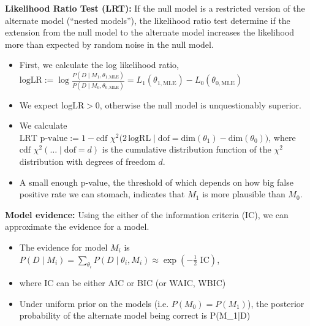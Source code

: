 {\bf Likelihood Ratio Test (LRT):} If the null model is a restricted version of the alternate model (``nested models''), the likelihood ratio test determine if the extension from the null model to the alternate model increases the likelihood more than expected by random noise in the null model.
\begin{itemize}
	\item First, we calculate the log likelihood ratio, $\text{logLR} := \log\frac{P(D\;|\;M_1, \theta_{1,\text{MLE}})}{P(D\;|\;M_0, \theta_{0,\text{MLE}})} = L_1(\theta_{1,\text{MLE}}) - L_0(\theta_{0,\text{MLE}})$
	\item We expect $\text{logLR} > 0$, otherwise the null model is unquestionably superior.
	\item We calculate $\text{LRT p-value} := 1 - \text{cdf }\chi^2\Big(2\,\text{logRL}\;\Big|\;\text{dof} = \text{dim}(\theta_1) - \text{dim}(\theta_0)\Big)$, where $\text{cdf }\chi^2(\ldots\;|\;\text{dof}=d)$ is the cumulative distribution function of the $\chi^2$ distribution with degrees of freedom $d$.
	\item A small enough p-value, the threshold of which depends on how big false positive rate we can stomach, indicates that $M_1$ is more plausible than $M_0$.
\end{itemize}
{\bf Model evidence:} Using the either of the information criteria (IC), we can approximate the evidence for a model.
\begin{itemize}
	\item The evidence for model $M_i$ is $P(D\;|\;M_i) = \sum_{\theta_i} P(D\;|\;\theta_i, M_i) \approx \exp\left(-\frac{1}{2} \text{ IC}\right)$, 
	\item where IC can be either AIC or BIC (or WAIC, WBIC)
	\item Under uniform prior on the models (i.e. $P(M_0) = P(M_1)$), the posterior probability of the alternate model being correct is
		\be
			 P(M_1\;|\;D) \approx {}
		\ee
\end{itemize}

\newpage
